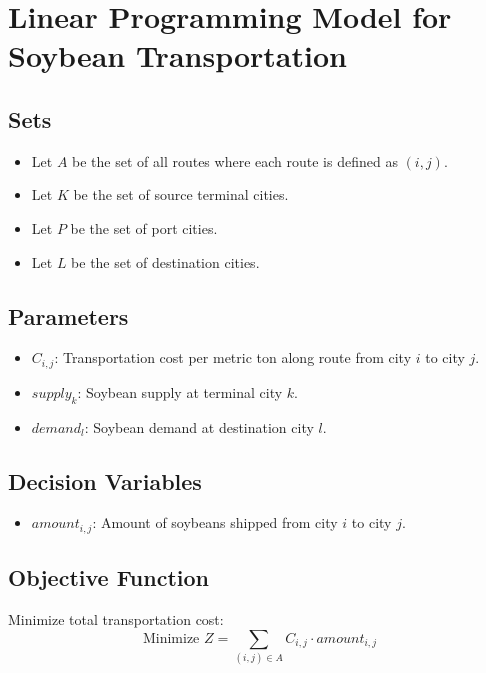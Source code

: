 \documentclass{article}
\begin{document}
\section*{Linear Programming Model for Soybean Transportation}

\subsection*{Sets}
\begin{itemize}
    \item Let \( A \) be the set of all routes where each route is defined as \((i, j)\).
    \item Let \( K \) be the set of source terminal cities.
    \item Let \( P \) be the set of port cities.
    \item Let \( L \) be the set of destination cities.
\end{itemize}

\subsection*{Parameters}
\begin{itemize}
    \item \( C_{i,j} \): Transportation cost per metric ton along route from city \( i \) to city \( j \).
    \item \( supply_k \): Soybean supply at terminal city \( k \).
    \item \( demand_l \): Soybean demand at destination city \( l \).
\end{itemize}

\subsection*{Decision Variables}
\begin{itemize}
    \item \( amount_{i,j} \): Amount of soybeans shipped from city \( i \) to city \( j \).
\end{itemize}

\subsection*{Objective Function}
Minimize total transportation cost:
\[
\text{Minimize } Z = \sum_{(i,j) \in A} C_{i,j} \cdot amount_{i,j}
\]
\end{document}

